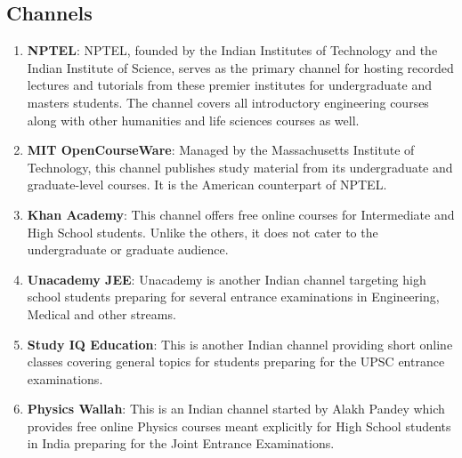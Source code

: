 \documentclass{article}
\begin{document}
\subsection{Channels}
\begin{enumerate}
    \item \textbf{NPTEL}: NPTEL, founded by the Indian Institutes of Technology and the Indian Institute of Science, serves as the primary channel for hosting recorded lectures and tutorials from these premier institutes for undergraduate and masters students. The channel covers all introductory engineering courses along with other humanities and life sciences courses as well.\\
    \item \textbf{MIT OpenCourseWare}: Managed by the Massachusetts Institute of Technology, this channel publishes study material from its undergraduate and graduate-level courses. It is the American counterpart of NPTEL.\\
    \item \textbf{Khan Academy}: This channel offers free online courses for Intermediate and High School students. Unlike the others, it does not cater to the undergraduate or graduate audience.\\

    \item \textbf{Unacademy JEE}: Unacademy is another Indian channel targeting high school students preparing for several entrance examinations in Engineering, Medical and other streams.\\
    \item \textbf{Study IQ Education}: This is another Indian channel providing short online classes covering general topics for students preparing for the UPSC entrance examinations.\\
    \item \textbf{Physics Wallah}: This is an Indian channel started by Alakh Pandey which provides free online Physics courses meant explicitly for High School students in India preparing for the Joint Entrance Examinations.\\
\end{enumerate}
\end{document}
